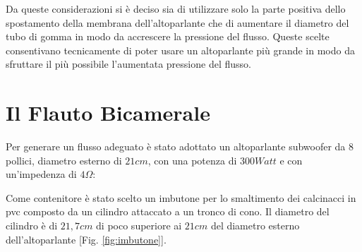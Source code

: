 Da queste considerazioni si è deciso sia di utilizzare solo la parte positiva dello spostamento della membrana dell’altoparlante che di aumentare il diametro del tubo di gomma in modo da accrescere la pressione del flusso.
Queste scelte consentivano tecnicamente di poter usare un altoparlante più grande in modo da sfruttare il più possibile l’aumentata pressione del flusso.

\section{Il Flauto Bicamerale}

Per generare un flusso adeguato è stato adottato un altoparlante subwoofer da 8 pollici, diametro esterno di $21 cm$, con una potenza di $300 Watt$ e con un’impedenza di $4 \Omega$:

Come contenitore è stato scelto un imbutone per lo smaltimento dei calcinacci in pvc composto da un cilindro attaccato a un tronco di cono.
Il diametro del cilindro è di $21,7 cm$ di poco superiore ai $21 cm$ del diametro esterno dell’altoparlante [Fig. \ref{fig:imbutone}].

